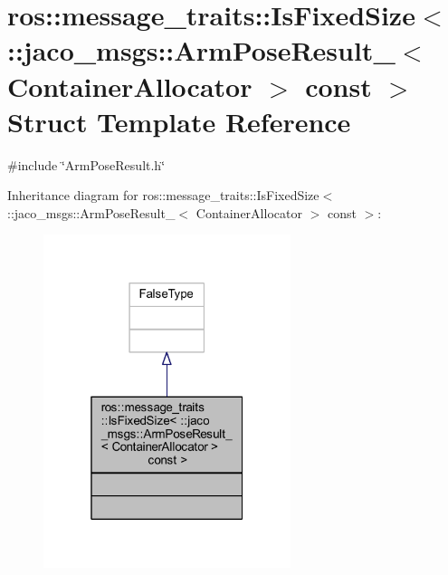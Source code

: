 \hypertarget{structros_1_1message__traits_1_1IsFixedSize_3_01_1_1jaco__msgs_1_1ArmPoseResult___3_01ContainerAllocator_01_4_01const_01_01_4}{}\section{ros\+:\+:message\+\_\+traits\+:\+:Is\+Fixed\+Size$<$ \+:\+:jaco\+\_\+msgs\+:\+:Arm\+Pose\+Result\+\_\+$<$ Container\+Allocator $>$ const $>$ Struct Template Reference}
\label{structros_1_1message__traits_1_1IsFixedSize_3_01_1_1jaco__msgs_1_1ArmPoseResult___3_01ContainerAllocator_01_4_01const_01_01_4}


{\ttfamily \#include \char`\"{}Arm\+Pose\+Result.\+h\char`\"{}}



Inheritance diagram for ros\+:\+:message\+\_\+traits\+:\+:Is\+Fixed\+Size$<$ \+:\+:jaco\+\_\+msgs\+:\+:Arm\+Pose\+Result\+\_\+$<$ Container\+Allocator $>$ const $>$\+:
\nopagebreak
\begin{figure}[H]
\begin{center}
\leavevmode
\includegraphics[width=205pt]{d5/de9/structros_1_1message__traits_1_1IsFixedSize_3_01_1_1jaco__msgs_1_1ArmPoseResult___3_01ContainerAc7f9481ec6739cba8250167b7c16c767}
\end{center}
\end{figure}



